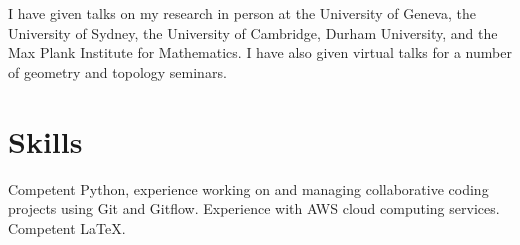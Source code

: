\documentclass[a4paper]{article}
\begin{document}
I have given talks on my research in person at the University of Geneva, the University of Sydney, the University of Cambridge, Durham University, and the Max Plank Institute for Mathematics. I have also given virtual talks for a number of geometry and topology seminars.

\section*{Skills}

Competent Python, experience working on and managing collaborative coding projects using Git and Gitflow. Experience with AWS cloud computing services. Competent \LaTeX.

%
%
%
%
%
%
%
%
\end{document}
